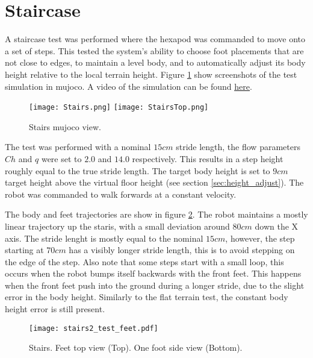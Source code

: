     \section{Staircase}
    A staircase test was performed where the hexapod was commanded to move onto a set of steps. This tested the system's ability to choose foot placements that are not close to edges, to maintain a level body, and to automatically adjust its body height relative to the local terrain height. Figure \ref{fig:stairs} show screenshots of the test simulation in \ac{mujoco}. A video of the simulation can be found \href{https://youtu.be/6v_fmXEp1Vs}{\color{blue}\underline{here}}.
    \begin{figure}[h]
        \centering
        \texttt{[image: Stairs.png]}
        \texttt{[image: StairsTop.png]}
        \caption{Stairs \ac{mujoco} view.}
        \label{fig:stairs}
    \end{figure}

    \noindent
    The test was performed with a nominal \(15cm\) stride length, the flow parameters \(Ch\) and \(q\) were set to \(2.0\) and \(14.0\) respectively. This results in a step height roughly equal to the true stride length. The target body height is set to \(9cm\) target height above the virtual floor height (see section \ref{sec:height_adjust}). The robot was commanded to walk forwards at a constant velocity.

    The body and feet trajectories are show in figure \ref{fig:stairs_feet}. The robot maintains a mostly linear trajectory up the staris, with a small deviation around \(80cm\) down the X axis. The stride lenght is mostly equal to the nominal \(15cm\), however, the step starting at \(70cm\) has a visibly longer stride length, this is to avoid stepping on the edge of the step. Also note that some steps start with a small loop, this occurs when the robot bumps itself backwards with the front feet. This happens when the front feet push into the ground during a longer stride, due to the slight error in the body height. Similarly to the flat terrain test, the constant body height error is still present. 
    \begin{figure}[h]
        \centering
        \texttt{[image: stairs2\_test\_feet.pdf]}
        \caption{Stairs. Feet top view (Top). One foot side view (Bottom).}
        \label{fig:stairs_feet}
    \end{figure}

